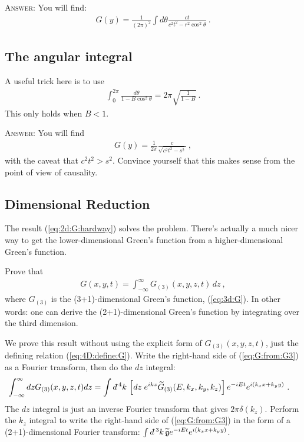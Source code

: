 \documentclass[12pt]{article}
\numberwithin{equation}{section}    %
\renewcommand{\tilde}{\widetilde}   %
\newcommand{\dbar}{d\mkern-6mu\mathchar'26}    %
\begin{document}
\textsc{Answer}: You will find:
\begin{align}
	G(y) = \frac{1}{(2\pi)^2} \int d\theta \frac{ct}{c^2t^2 - r^2\cos^2\theta} \ .
\end{align}

\subsection{The angular integral}

A useful trick here is to use
\begin{align}
	\int_0^{2\pi} \frac{d\theta}{1-B\cos^2\theta} = 2\pi \sqrt{\frac{1}{1-B}} \ .
\end{align}
This only holds when $B<1$. 

\textsc{Answer}: You will find
\begin{align}
	G(y) = \frac{1}{2\pi} \frac{c}{\sqrt{c^2 t^2 - s^2}} \ ,
	\label{eq:2d:G:hardway}
\end{align}
with the caveat that $c^2t^2 > s^2$. Convince yourself that this makes sense from the point of view of causality.


\subsection{Dimensional Reduction}


The result (\ref{eq:2d:G:hardway}) solves the problem. 
%
There's actually a much nicer way to get the lower-dimensional Green's function from a higher-dimensional Green's function. 

Prove that 
\begin{align}
	G(x,y,t) = \int_{-\infty}^\infty G_{(3)}(x,y,z,t) \, dz \ ,
	\label{eq:G:from:G3}
\end{align}
where $G_{(3)}$ is the (3+1)-dimensional Green's function, (\ref{eq:3d:G}). In other words: one can derive the (2+1)-dimensional Green's function by integrating over the third dimension.

We prove this result without using the explicit form of $G_{(3)}(x,y,z,t)$, just the defining relation (\ref{eq:4D:define:G}). Write the right-hand side of (\ref{eq:G:from:G3}) as a Fourier transform, then do the $dz$ integral:
\begin{align}
	\int_{-\infty}^\infty dz G_{(3)}(x,y,z,t)dz
	&=
	\int \dbar^4k \,
	\left[dz\; e^{ikz} \tilde G_{(3)}(E,k_x, k_y, k_z)\right]
	 e^{-iEt} e^{i(k_xx + k_y y)} \ .
\end{align}
The $dz$ integral is just an inverse Fourier transform that gives $2\pi\delta(k_z)$. Perform the $k_z$ integral to write the right-hand side of (\ref{eq:G:from:G3}) in the form of a (2+1)-dimensional Fourier transform: $\int \dbar^3 k \, \tilde{\mathfrak{g}}e^{-iEt}e^{i(k_xx+k_yy)}$. 
\end{document}
